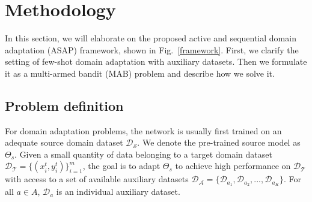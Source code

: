 \vspace{-0.2cm}
\section{Methodology}
\vspace{-0.2cm}
In this section, we will elaborate on the proposed active and sequential domain adaptation (ASAP) framework, shown in Fig.~\ref{framework}.
First, we clarify the setting of few-shot domain adaptation with auxiliary datasets.
Then we formulate it as a multi-armed bandit (MAB) problem and describe how we solve it.


\vspace{-0.2cm}
\subsection{Problem definition}
\vspace{-0.1cm}
For domain adaptation problems, the network is usually first trained on an adequate source domain dataset $\mathcal{D}_\mathcal{S}$. 
We denote the pre-trained source model as $\Theta_s$.
Given a small quantity of data belonging to a target domain dataset $\mathcal{D}_\mathcal{T}=\{(x_i^t,y_i^t)\}_{i=1}^{m}$, the goal is to adapt $\Theta_s$ to achieve high performance on $\mathcal{D}_\mathcal{T}$ with access to a set of available auxiliary datasets $\mathcal{D}_\mathcal{A} = \{\mathcal{D}_{a_1},\mathcal{D}_{a_2},...,\mathcal{D}_{a_K}\}$.
For all $a \in A$, $\mathcal{D}_a$ is an individual auxiliary dataset.

